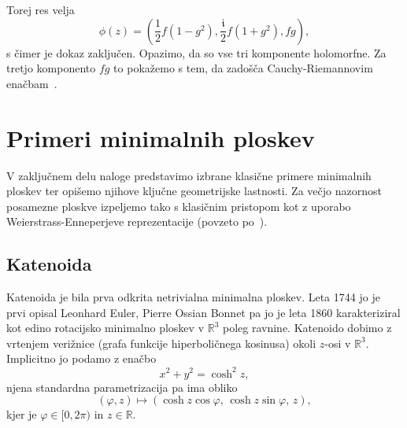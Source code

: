 \documentclass[fin1, tisk, bibtex]{fmfdelo}
\begin{document}
\begin{dokaz}
    Torej res velja
    \begin{equation*}
        \phi(z)=\left(\frac{1}{2} f\left(1-g^2\right), \frac{\mathfrak{i}}{2} f\left(1+g^2\right), f g\right),    
    \end{equation*}
    s čimer je dokaz zaključen. Opazimo, da so vse tri komponente holomorfne. Za tretjo komponento $f g$ to pokažemo s tem, da zadošča Cauchy-Riemannovim enačbam~\cite[str.~54-56]{sanbernardino}.
\end{dokaz}




\section{Primeri minimalnih ploskev}

V zaključnem delu naloge predstavimo izbrane klasične primere minimalnih ploskev ter opišemo njihove ključne geometrijske lastnosti. Za večjo nazornost posamezne ploskve izpeljemo tako s klasičnim pristopom kot z uporabo Weierstrass-Enneperjeve reprezentacije (povzeto po~\cite[Razdelek 2.8]{monograf}).


\subsection{Katenoida}

Katenoida je bila prva odkrita netrivialna minimalna ploskev. Leta 1744 jo je prvi opisal Leonhard Euler, Pierre Ossian Bonnet pa jo je leta 1860 karakteriziral kot edino rotacijsko minimalno ploskev v $\mathbb{R}^3$ poleg ravnine. Katenoido dobimo z vrtenjem verižnice (grafa funkcije hiperboličnega kosinusa) okoli $z$-osi v $\mathbb{R}^3$. Implicitno jo podamo z enačbo
\begin{equation*}
    x^2+y^2=\cosh^2 z,
\end{equation*}
njena standardna parametrizacija pa ima obliko
\begin{equation*}
    (\varphi, z) \mapsto (\cosh z \cos \varphi, \, \cosh z \sin \varphi, \, z),
\end{equation*}
kjer je $\varphi \in [0, 2\pi)$ in $z \in \mathbb{R}$.
\end{document}

